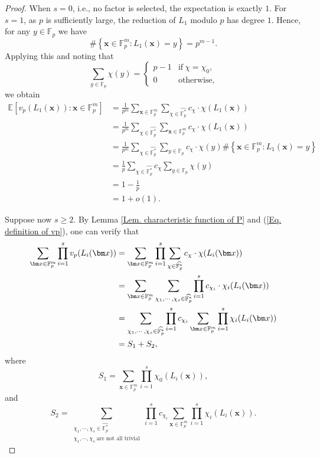\documentclass[12pt]{amsart}
\def\x{{\bm x}}
\theoremstyle{plain}
\theoremstyle{remark}
\begin{document}
	\begin{proof}
		When $s=0$, i.e., no factor is selected, the expectation is exactly $1$. For $s=1$, as $p$ is sufficiently large, the reduction of $L_1$ modulo $p$ has degree $1$. Hence, for any $y\in\mathbb{F}_p$ we have 
		$$\#\left\{\x\in\mathbb{F}_p^m: L_1(\x)=y\right\}=p^{m-1}.$$
		Applying this and noting that
		$$\sum_{y\in\mathbb{F}_p}\chi(y)=
		\begin{cases}
			p-1 & \mbox{if}\ \chi=\chi_0,\\
			0    & \mbox{otherwise},
		\end{cases}$$
		we obtain 
		\begin{align*}
			\mathbb{E}\left[v_p(L_1(\x)): \x\in\mathbb{F}_p^m\right]
&=\frac{1}{p^m}\sum_{\x\in\mathbb{F}_p^m}\sum_{\chi\in\widehat{\mathbb{F}_p^*}}c_{\chi}\cdot \chi(L_1(\x))\\
&=\frac{1}{p^m}\sum_{\chi\in\widehat{\mathbb{F}_p^*}}\sum_{\x\in\mathbb{F}_p^m}c_{\chi}\cdot \chi(L_1(\x))\\
&=\frac{1}{p^m}\sum_{\chi\in\widehat{\mathbb{F}_p^*}}\sum_{y\in\mathbb{F}_p}c_{\chi}\cdot \chi(y)\#\left\{\x\in\mathbb{F}_p^m: L_1(\x)=y\right\}\\
&=\frac{1}{p}\sum_{\chi\in\widehat{\mathbb{F}_p^*}}c_{\chi}\sum_{y\in\mathbb{F}_p}\chi(y)\\
&=1-\frac{1}{p}\\
&=1+o(1).
		\end{align*}
		
		Suppose now $s\ge2$. By Lemma \ref{Lem. characteristic function of P} and (\ref{Eq. definition of vp}), one can verify that 
		\begin{align}\label{Eq. sum is trivial plus nontrivial}
			\sum_{\x\in\mathbb{F}_p^m}\prod_{i=1}^{s}v_p(L_i(\x))
&=\sum_{\x\in\mathbb{F}_p^m}\prod_{i=1}^{s}\sum_{\chi\in\widehat{\mathbb{F}_p^*}}c_{\chi}\cdot \chi(L_i(\x))\notag\\
&=\sum_{\x\in\mathbb{F}_p^m}\sum_{\chi_1,\cdots,\chi_s\in\widehat{\mathbb{F}_p^*}}\prod_{i=1}^{s}c_{\chi_i}\cdot \chi_i(L_i(\x))\notag\\
&=\sum_{\chi_1,\cdots,\chi_s\in\widehat{\mathbb{F}_p^*}}\prod_{i=1}^{s}c_{\chi_i} \sum_{\x\in\mathbb{F}_p^m}\prod_{i=1}^{s}\chi_i(L_i(\x))\notag\\
&=S_1+S_2,
		\end{align}
	where 
	$$S_1=\sum_{\x\in\mathbb{F}_p^m}\prod_{i=1}^{s}\chi_0(L_i(\x)),$$
	and
	$$S_2=\sum_{\substack{\chi_1,\cdots,\chi_s\in\widehat{\mathbb{F}_p^*}\\ \chi_1,\cdots,\chi_s\ \text{are not all trivial}}}\prod_{i=1}^{s}c_{\chi_i} \sum_{\x\in\mathbb{F}_p^m}\prod_{i=1}^{s}\chi_i(L_i(\x)).$$
		

\end{proof}
\end{document}
